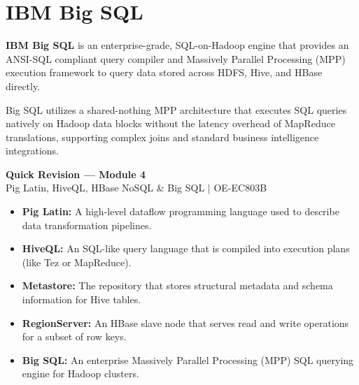 \documentclass[12pt,a4paper]{article}
\begin{document}
\section{IBM Big SQL}

\begin{tcolorbox}[defbox, title={IBM Big SQL}]
  \textbf{IBM Big SQL} is an enterprise-grade, SQL-on-Hadoop engine that provides an ANSI-SQL compliant query compiler and Massively Parallel Processing (MPP) execution framework to query data stored across HDFS, Hive, and HBase directly.
\end{tcolorbox}

Big SQL utilizes a shared-nothing MPP architecture that executes SQL queries natively on Hadoop data blocks without the latency overhead of MapReduce translations, supporting complex joins and standard business intelligence integrations.

\newpage

\begin{center}
  {\large\bfseries\color{myred} Quick Revision --- Module 4}\\[3pt]
  {\small\color{mydark} Pig Latin, HiveQL, HBase NoSQL \& Big SQL $|$ OE-EC803B}
\end{center}
\noindent{\color{myred}\rule{\linewidth}{1.2pt}}
\vspace{8pt}

\begin{tcolorbox}[defbox, title={\textbf{One-Line Definitions}}]
\begin{itemize}[leftmargin=*, itemsep=3pt, topsep=0pt]
  \item \textbf{Pig Latin:} A high-level dataflow programming language used to describe data transformation pipelines.
  \item \textbf{HiveQL:} An SQL-like query language that is compiled into execution plans (like Tez or MapReduce).
  \item \textbf{Metastore:} The repository that stores structural metadata and schema information for Hive tables.
  \item \textbf{RegionServer:} An HBase slave node that serves read and write operations for a subset of row keys.
  \item \textbf{Big SQL:} An enterprise Massively Parallel Processing (MPP) SQL querying engine for Hadoop clusters.
\end{itemize}
\end{tcolorbox}
\end{document}
